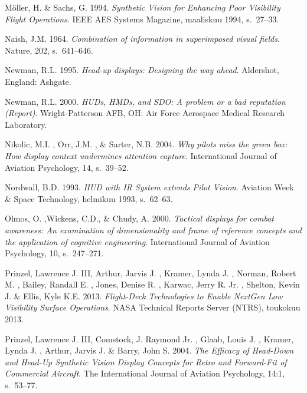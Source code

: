 \documentclass[utf8,bachelor,manualbib]{gradu3}
\begin{document}
\begin{thebibliography}{}
Möller, H. \& Sachs, G. 1994.
\textit{Synthetic Vision for Enhancing Poor Visibility Flight Operations}.
IEEE AES Systems Magazine, maaliskuu 1994, s.~27--33.

Naish, J.M. 1964.
\textit{Combination of information in superimposed visual fields}.
Nature, 202, s.~641--646.

Newman, R.L. 1995.
\textit{Head-up displays: Designing the way ahead}.
Aldershot, England: Ashgate.

Newman, R.L. 2000.
\textit{HUDs, HMDs, and SDO: A problem or a bad reputation (Report)}.
Wright-Patterson AFB, OH: Air Force Aerospace Medical Research Laboratory.

Nikolic, M.I. , Orr, J.M. , \& Sarter, N.B. 2004.
\textit{Why pilots miss the green box: How display context undermines attention capture}.
International Journal of Aviation Psychology, 14, s.~39--52.

Nordwall, B.D. 1993.
\textit{HUD with IR System extends Pilot Vision}.
Aviation Week \& Space Technology, helmikuu 1993, s.~62--63.

Olmos, O. ,Wickens, C.D., \& Chudy, A. 2000.
\textit{Tactical displays for combat awareness: An examination of dimensionality and frame of reference concepts and the application of cognitive engineering}.
International Journal of Aviation Psychology, 10, s.~247--271.

Prinzel, Lawrence J. III, Arthur, Jarvis J. , Kramer, Lynda J. ,  Norman, Robert M. , Bailey, Randall E. , Jones, Denise R. ,  Karwac, Jerry R. Jr. , Shelton, Kevin J. \& Ellis, Kyle K.E. 2013.
\textit{Flight-Deck Technologies to Enable NextGen Low Visibility Surface Operations}.
NASA Technical Reports Server (NTRS), toukokuu 2013.

Prinzel, Lawrence J. III, Comstock, J. Raymond Jr. , Glaab, Louis J. , Kramer, Lynda J. , Arthur, Jarvis J. \& Barry, John S. 2004.
\textit{The Efficacy of Head-Down and Head-Up Synthetic Vision Display Concepts for Retro and Forward-Fit of Commercial Aircraft}.
The International Journal of Aviation Psychology, 14:1, s.~53--77.


\end{thebibliography}
\end{document}
